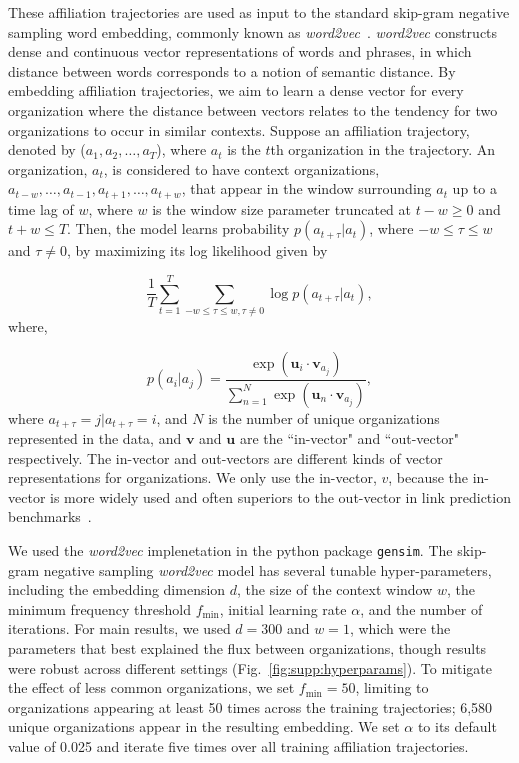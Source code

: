 \documentclass[12pt]{article} %
\begin{document}
These affiliation trajectories are used as input to the standard skip-gram negative sampling word embedding, commonly known as \textit{word2vec}~\autocite{mikolov2013word2vec}.
\textit{word2vec} constructs dense and continuous vector representations of words and phrases, in which distance between words corresponds to a notion of semantic distance. By embedding affiliation trajectories, we aim to learn a dense vector for every organization where the distance between vectors relates to the tendency for two organizations to occur in similar contexts.
Suppose an affiliation trajectory, denoted by ($a_{1}, a_{2}, \ldots, a_{T}$), where $a_{t}$ is the $t$th organization in the trajectory. An organization, $a_{t}$, is considered to have context organizations, $a_{t-w}, \ldots, a_{t-1}, a_{t+1},\ldots, a_{t+w}$, that appear in the window surrounding $a_t$ up to a time lag of $w$, where $w$ is the window size parameter truncated at $t - w \geq 0$ and $t + w \leq T$. Then, the model learns probability $p(a_{t + \tau} \vert a_{t})$, where $-w\leq \tau\leq w$ and $\tau \neq 0$,  by maximizing its log likelihood given by

%
%
\begin{equation}
\frac{1}{T}\sum_{t = 1}^{T} \sum_{-w \leq \tau \leq w, \tau \neq 0} \log p(a_{t + \tau} \vert a_{t}),
\end{equation}
where,

%
%
\begin{equation}
p(a_{i} \vert a_{j}) = \frac{\exp(\bm{u}_{i} \cdot \bm{v}_{a_{j}})}{\sum_{n=1}^N \exp(\bm{u}_{n} \cdot \bm{v}_{a_{j}})},
\end{equation}
where $a_{t+\tau} = j \vert a_{t+\tau} = i$, and $N$ is the number of unique organizations represented in the data, and $\bm{v}$ and $\bm{u}$ are the ``in-vector" and ``out-vector" respectively.
The in-vector and out-vectors are different kinds of vector representations for organizations. We only use the in-vector, $v$, because the in-vector is more widely used and often superiors to the out-vector in link prediction benchmarks~\autocite{linzhuo2020hyperbolic, tshitoyan2019mat2vec, garg2018gender, kozlowski2018geometry, hamilton2016diachronic, le2014doc2vec, nakandala2017gendered}.


We used the \textit{word2vec}  implenetation in the python package \texttt{gensim}. 
The skip-gram negative sampling  \textit{word2vec} model has several tunable hyper-parameters, including the embedding dimension $d$, the size of the context window $w$, the minimum frequency threshold $f_{\min}$, initial learning rate $\alpha$, and the number of iterations.
For main results, we used $d=300$ and $w=1$, which were the parameters that best explained the flux between organizations, though results were robust across different settings (Fig.~\ref{fig:supp:hyperparams}).
To mitigate the effect of less common organizations, we set $f_{\min} = 50$, limiting to organizations appearing at least 50 times across the training trajectories;
6,580 unique organizations appear in the resulting embedding.
We set $\alpha$ to its default value of 0.025 and iterate five times over all training affiliation trajectories.
\end{document}
